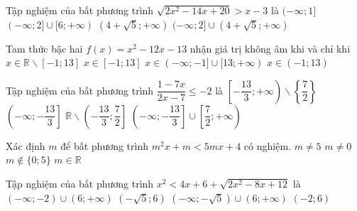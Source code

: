\begin{ex}%
Tập nghiệm của bất phương trình $\sqrt{2x^2-14x+20}>x-3$ là 	
	\choice
	{$(-\infty;1]$}
	{$(-\infty;2]\cup [6;+\infty)$}
	{$\left(4+\sqrt{5};+\infty\right)$}
	{\True $(-\infty;2]\cup \left(4+\sqrt{5};+\infty\right)$}
\end{ex}
\begin{ex}%
Tam thức bậc hai $f(x)=x^2-12x-13$ nhận giá trị không âm khi và chỉ khi	
	\choice
	{$x\in\mathbb{R}\backslash [-1;13]$}
	{$x\in [-1;13]$}
	{\True $x\in (-\infty;-1]\cup [13;+\infty)$}
	{$x\in (-1;13)$}
\end{ex}
\begin{ex}%
Tập nghiệm của bất phương trình $\dfrac{1-7x}{2x-7}\le -2$ là	
	\choice
	{$\left[-\dfrac{13}{3};+\infty\right)\backslash\left\{\dfrac{7}{2}\right\}$}
	{$\left(-\infty;-\dfrac{13}{3}\right]$}
	{\True $\mathbb{R}\backslash\left(-\dfrac{13}{3};\dfrac{7}{2}\right]$}
	{$\left(-\infty;-\dfrac{13}{3}\right]\cup \left[\dfrac{7}{2};+\infty\right)$}
\end{ex}
\begin{ex}%
Xác định $m$ để bất phương trình $m^2x+m<5mx+4$ có nghiệm.	
	\choice
	{\True $m\neq 5$}
	{$m\neq 0$}
	{$m\not\in\{0;5\}$}
	{$m\in\mathbb{R}$}
\end{ex}
\begin{ex}%
Tập nghiệm của bất phương trình $x^2<4x+6+\sqrt{2x^2-8x+12}$ là 	
	\choice
	{$(-\infty;-2)\cup (6;+\infty)$}
	{$\left(-\sqrt{5};6\right)$}
	{$\left(-\infty;-\sqrt{5}\right)\cup (6;+\infty)$}
	{\True $(-2;6)$}
\end{ex}
